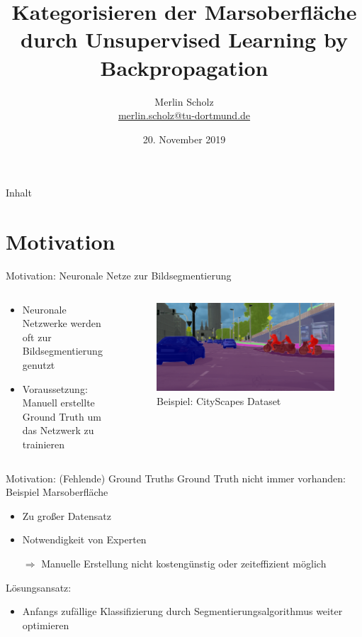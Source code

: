 \documentclass[aspectratio=169]{beamer}
\title[Analyse der Marsoberfläche durch Unsupervised Learning]{Kategorisieren der Marsoberfläche durch Unsupervised Learning by Backpropagation}
\author[Merlin Scholz]{Merlin Scholz\\\small\href{mailto:merlin.scholz@tu-dortmund.de}{merlin.scholz@tu-dortmund.de}}
\institute{TU Dortmund}
\date[20.11.2019]{20. November 2019}
\begin{document}
\frame{\titlepage}

\begin{frame}{Inhalt}
	\tableofcontents
\end{frame}

\section{Motivation}

\begin{frame}{Motivation: Neuronale Netze zur Bildsegmentierung}
\begin{columns}
	\begin{column}{.5\textwidth}
		\begin{itemize}
			\item Neuronale Netzwerke werden oft zur Bildsegmentierung genutzt
			\item Voraussetzung: Manuell erstellte Ground Truth um das Netzwerk zu trainieren
			\end{itemize}
	\end{column}
	\begin{column}{.5\textwidth}
		\begin{figure}[H]
			\includegraphics[width=\textwidth,keepaspectratio]{koeln00.png}
			\caption{Beispiel: CityScapes Dataset\cite{Cordts_2016_CVPR}}
		\end{figure}
	\end{column}
\end{columns}


\end{frame}

\begin{frame}{Motivation: (Fehlende) Ground Truths}
Ground Truth nicht immer vorhanden: Beispiel Marsoberfläche
\begin{itemize}
	\item Zu großer Datensatz
	\item Notwendigkeit von Experten
	\item[$\Rightarrow$] Manuelle Erstellung nicht kostengünstig oder zeiteffizient möglich
\end{itemize}
\medskip
Lösungsansatz:
\begin{itemize}
	\item Anfangs zufällige Klassifizierung durch Segmentierungsalgorithmus weiter optimieren
\end{itemize}
\end{frame}
\end{document}
